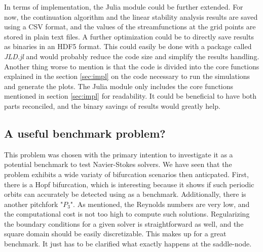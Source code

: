 In terms of implementation, the Julia module could be further extended. For
now, the continuation algorithm and the linear stability analysis results are
saved using a CSV format, and the values of the streamfunctions at the grid
points are stored in plain text files. A further optimization could be to
directly save results as binaries in an HDF5 format. This could easily be done
with a package called \emph{JLD.jl} and would probably reduce the code size and
simplify the results handling. Another thing worse to mention is that the code
is divided into the core functions explained in the section \ref{sec:impl} on
the code necessary to run the simulations and generate the plots. The Julia
module only includes the core functions mentioned in section \ref{sec:impl} for
readability. It could be beneficial to have both parts reconciled, and the
binary savings of results would greatly help.

\subsection{A useful benchmark problem?}

This problem was chosen with the primary intention to investigate it as a
potential benchmark to test Navier-Stokes solvers. We have seen that the
problem exhibits a wide variaty of bifurcation scenarios then anticpated.
First, there is a Hopf bifurcation, which is interesting because it shows if
such periodic orbits can accurately be detected using as a benchmark.
Additionally, there is another pitchfork "$P_3$". As mentioned, the Reynolds
numbers are very low, and the computational cost is not too high to compute
such solutions. Regularizing the boundary conditions for a given solver is
straightforward as well, and the square domain should be easily discretizable.
This makes up for a great benchmark. It just has to be clarified what exactly
happens at the saddle-node.
